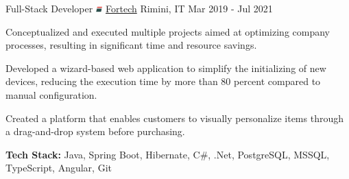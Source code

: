 \begin{cventries}
  \cventry
    {Full-Stack Developer} %
    {   \includegraphics[width=0.25cm]{cv/images/fortech-favicon-transparent.png}
        \href{http://www.fortech.it/en}
        {Fortech}
    } %
    {Rimini, IT} %
    {Mar 2019 - Jul 2021} %
    {
      \begin{cvitems} %
        \item {Conceptualized and executed multiple projects aimed at optimizing company processes, resulting in significant time and resource savings.}
        \item {Developed a wizard-based web application to simplify the initializing of new devices, reducing the execution time by more than 80 percent compared to manual configuration.}
        \item {Created a platform that enables customers to visually personalize items through a drag-and-drop system before purchasing.}
        \item {\textbf{Tech Stack:} Java, Spring Boot, Hibernate, C\#, .Net, PostgreSQL, MSSQL, TypeScript, Angular, Git}
      \end{cvitems}
    }

\end{cventries}
